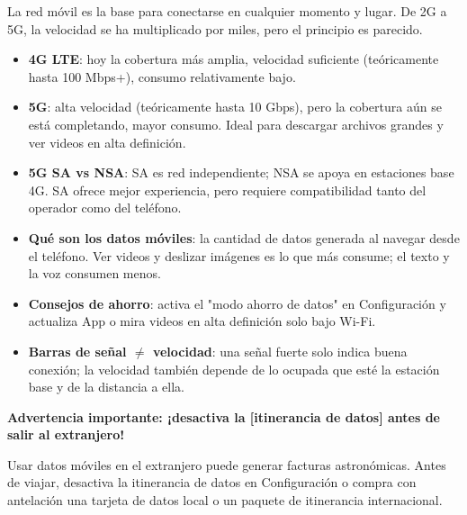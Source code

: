 
La red móvil es la base para conectarse en cualquier momento y lugar. De 2G a 5G, la velocidad se ha multiplicado por miles, pero el principio es parecido.


\begin{itemize}
  \item \textbf{4G LTE}: hoy la cobertura más amplia, velocidad suficiente (teóricamente hasta 100 Mbps+), consumo relativamente bajo.
  \item \textbf{5G}: alta velocidad (teóricamente hasta 10 Gbps), pero la cobertura aún se está completando, mayor consumo. Ideal para descargar archivos grandes y ver videos en alta definición.
  \item \textbf{5G SA vs NSA}: SA es red independiente; NSA se apoya en estaciones base 4G. SA ofrece mejor experiencia, pero requiere compatibilidad tanto del operador como del teléfono.
\end{itemize}


\begin{itemize}
  \item \textbf{Qué son los datos móviles}: la cantidad de datos generada al navegar desde el teléfono. Ver videos y deslizar imágenes es lo que más consume; el texto y la voz consumen menos.
  \item \textbf{Consejos de ahorro}: activa el "modo ahorro de datos" en Configuración y actualiza App o mira videos en alta definición solo bajo Wi-Fi.
  \item \textbf{Barras de señal $\neq$ velocidad}: una señal fuerte solo indica buena conexión; la velocidad también depende de lo ocupada que esté la estación base y de la distancia a ella.
\end{itemize}

\textbf{Advertencia importante: ¡desactiva la [itinerancia de datos] antes de salir al extranjero!}\par

Usar datos móviles en el extranjero puede generar facturas astronómicas. Antes de viajar, desactiva la itinerancia de datos en Configuración o compra con antelación una tarjeta de datos local o un paquete de itinerancia internacional.


